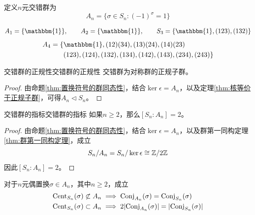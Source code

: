 \begin{definition}
	定义$n$元交错群为
	$$
	A_n=\{ \sigma\in S_n:(-1)^\sigma=1 \}
	$$
\end{definition}

\begin{problem}
	$$
	A_1=\{\mathbbm{1}\},\qquad A_2=\{\mathbbm{1}\},\qquad S_3=\{ \mathbbm{1},(123),(132) \}
	$$
	\begin{align*}
		A_4 = \{ & \mathbbm{1},(12)(34),(13)(24),(14)(23)\\
		& (123),(124),(132),(134),(142),(143),(234),(243)\}
	\end{align*}
\end{problem}

\begin{theorem}{交错群的正规性}{交错群的正规性}
	交错群为对称群的正规子群。
\end{theorem}

\begin{proof}
	由命题\ref{thm:置换符号的群同态性}，结合$\ker\epsilon=A_n$，以及定理\ref{thm:核等价于正规子群}，可得$A_n\lhd S_n$。
\end{proof}

\begin{theorem}{交错群的指标}{交错群的指标}
	如果$n\ge 2$，那么$[S_n:A_n]=2$。
\end{theorem}

\begin{proof}
	由命题\ref{thm:置换符号的群同态性}，结合$\ker\epsilon=A_n$，以及群第一同构定理\ref{thm:群第一同构定理}，成立
	$$
	S_n/A_n=S_n/\ker\epsilon\cong \mathbb{Z}/2\mathbb{Z}
	$$
	因此$[S_n:A_n]=2$。
\end{proof}

\begin{proposition}
	对于$n$元偶置换$\sigma\in A_n$，其中$n\ge 2$，成立
	\begin{align*}
		&\mathrm{Cent}_{S_n}(\sigma)\not\subset A_n\implies \mathrm{Conj}_{A_n}(\sigma)=\mathrm{Conj}_{S_n}(\sigma)\\
		&\mathrm{Cent}_{S_n}(\sigma)\subset A_n\implies 2|\mathrm{Conj}_{A_n}(\sigma)|=|\mathrm{Conj}_{S_n}(\sigma)|
	\end{align*}
\end{proposition}

